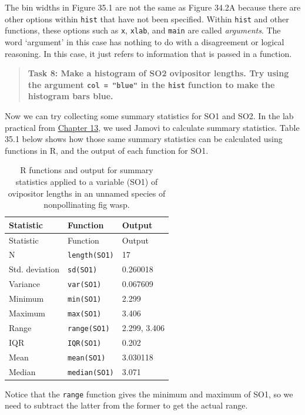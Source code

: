 \documentclass[
]{scrbook}
\begin{document}
The bin widths in Figure 35.1 are not the same as Figure 34.2A because there are other options within \texttt{hist} that have not been specified.
Within \texttt{hist} and other functions, these options such as \texttt{x}, \texttt{xlab}, and \texttt{main} are called \emph{arguments}.
The word `argument' in this case has nothing to do with a disagreement or logical reasoning.
In this case, it just refers to information that is passed in a function.

\begin{quote}
\textbf{Task 8: Make a histogram of SO2 ovipositor lengths. Try using the argument \texttt{col\ =\ "blue"} in the \texttt{hist} function to make the histogram bars blue.}
\end{quote}

Now we can try collecting some summary statistics for SO1 and SO2.
In the lab practical from \protect\hyperlink{Chapter_13}{Chapter 13}, we used Jamovi to calculate summary statistics.
Table 35.1 below shows how those same summary statistics can be calculated using functions in R, and the output of each function for SO1.

\begin{longtable}[]{@{}lll@{}}
\caption{\label{tab:unnamed-chunk-210}R functions and output for summary statistics applied to a variable (SO1) of ovipositor lengths in an unnamed species of nonpollinating fig wasp.}\tabularnewline
\toprule
Statistic & Function & Output \\
\midrule
\endfirsthead
\toprule
Statistic & Function & Output \\
\midrule
\endhead
N & \texttt{length(SO1)} & 17 \\
Std. deviation & \texttt{sd(SO1)} & 0.260018 \\
Variance & \texttt{var(SO1)} & 0.067609 \\
Minimum & \texttt{min(SO1)} & 2.299 \\
Maximum & \texttt{max(SO1)} & 3.406 \\
Range & \texttt{range(SO1)} & 2.299, 3.406 \\
IQR & \texttt{IQR(SO1)} & 0.202 \\
Mean & \texttt{mean(SO1)} & 3.030118 \\
Median & \texttt{median(SO1)} & 3.071 \\
\bottomrule
\end{longtable}

Notice that the \texttt{range} function gives the minimum and maximum of SO1, so we need to subtract the latter from the former to get the actual range.
\end{document}
